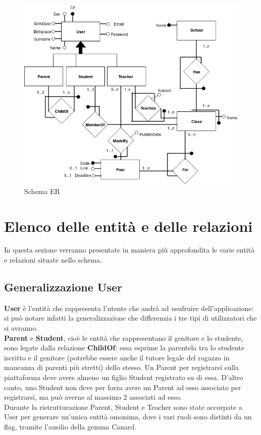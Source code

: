 \documentclass[Lau, binding=0.6cm]{sapthesis}
\begin{document}
\begin{figure}[H]
	\centering
	\includegraphics[width=1\linewidth]{images/db_HiSchool.png} 
	\caption{Schema ER}
	\label{fig:schema_ER}
\end{figure}

\section{Elenco delle entità e delle relazioni}

In questa sezione verranno presentate in maniera più approfondita le varie entità e relazioni situate nello schema.
\subsection{Generalizzazione User}
\textbf{User} è l'entità che rappresenta l'utente che andrà ad usufruire dell'applicazione: si può notare infatti la generalizzazione che differenzia i tre tipi di utilizzatori che si avranno.\\
\textbf{Parent} e \textbf{Student}, cioè le entità che rappresentano il genitore e lo studente, sono legate dalla relazione \textbf{ChildOf}: essa esprime la parentela tra lo studente iscritto e il genitore (potrebbe essere anche il tutore legale del ragazzo in mancanza di parenti più stretti) dello stesso. Un Parent per registrarsi sulla piattaforma deve avere almeno un figlio Student registrato su di essa. D'altro canto, uno Student non deve per forza avere un Parent ad esso associato per registrarsi, ma può averne al massimo 2 associati ad esso.\\
Durante la ristrutturazione Parent, Student e Teacher sono state accorpate a User per generare un'unica entità omonima, dove i vari ruoli sono distinti da un flag, tramite l'ausilio della gemma Canard.
\end{document}
